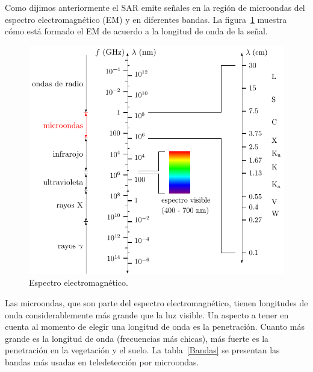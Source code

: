 Como dijimos anteriormente el SAR emite señales en la región de microondas del espectro electromagnético (EM) y en diferentes bandas. La figura~\ref{Espectro} muestra cómo está formado el EM de acuerdo a la longitud de onda de la señal.

\begin{figure}[hbt]
	\centering    
	\includegraphics[scale=1]{../../Figures/Tesis/Capitulo3/EEM.pdf}
	\caption{\label{Espectro}Espectro electromagnético.}
\end{figure}

Las microondas, que son parte del espectro electromagnético, tienen longitudes de onda considerablemente más grande que la luz visible. Un aspecto a tener en cuenta al momento de elegir una longitud de onda es la penetración. Cuanto más grande es la longitud de onda (frecuencias más chicas), más fuerte es la penetración en la vegetación y el suelo. La tabla~\ref{Bandas} se presentan las bandas más usadas en teledetección por microondas.

